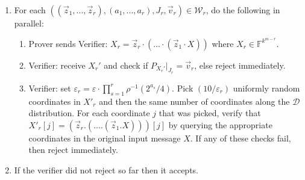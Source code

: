 \documentclass[10pt,a4paper]{article}
\makeatletter
\newcommand{\F}{\mathbb{F}}
\newenvironment{protocol}[1][htb]{
    \renewcommand{\ALG@name}{Protocol}
    \begin{algorithm}[#1]
    }{\end{algorithm}
}
\makeatother
\begin{document}
\begin{protocol}
\begin{enumerate}
    \item For each $((\vec{z}_{1}, . . . , \vec{z}_{r}),(a_{1}, . . . , a_{r}), J_{r}, \vec{v}_{r}) \in \mathcal{W}_{r}$, do the following in parallel:
    \begin{enumerate}
        \item \label{SentX} Prover sends Verifier: $X_{r} = \vec{z}_{r} \cdot (. . . \cdot (\vec{z}_{1} \cdot X))$ where $X_r \in \F^{k^{m-r}}$.
        \item Verifier: receive $X_{r}'$ and check if $P_{X_{r}'}|_{J_{r}} = \vec{v}_{r}$, else reject immediately.
        \item\label{MainIPPQueries} Verifier: set $\varepsilon_{r} = \varepsilon \cdot \prod_{s=1}^{r}\rho^{-1}(2^{a_{s}} /4)$. Pick $(10/\varepsilon_{r})$ uniformly random coordinates in $X'_{r}$ and then the same number of coordinates along the $\mathcal{D}$ distribution. For each coordinate $j$ that was picked, verify that $X'_{r}[j] = (\vec{z}_{r} . (. . . . (\vec{z}_{1} . X)))[j]$ by querying the appropriate coordinates in the original input message $X$. If any of these checks fail, then reject immediately.
    \end{enumerate}
    \item If the verifier did not reject so far then it accepts.
\end{enumerate}
\end{protocol}
\end{document}
